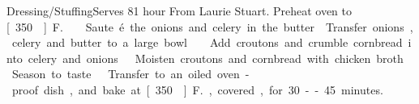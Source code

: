 \begin{recipe}{Dressing/Stuffing}{Serves 8}{1 hour}
\freeform From Laurie Stuart.
\newstep Preheat oven to \unit[350\0]{F.}
Saute\'{e} the onions and celery in the butter.
\newstep
Transfer onions, celery and butter to a large bowl.
\newstep
{}
Add croutons and crumble cornbread into celery and onions.
\newstep
{}
Moisten croutons and cornbread with chicken broth.
\newstep
{}
Season to taste.
\newstep
\ing[]{}{}
Transfer to an oiled oven-proof dish, and bake at \unit[350\0]{F.}, covered, for 30--45 minutes.
\end{recipe}
